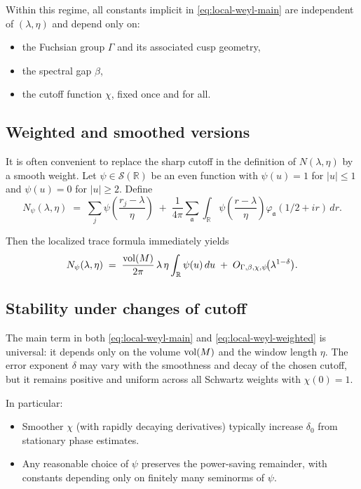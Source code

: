 Within this regime, all constants implicit in \eqref{eq:local-weyl-main} are independent of $(\lambda,\eta)$ and depend only on:
\begin{itemize}
  \item the Fuchsian group $\Gamma$ and its associated cusp geometry,
  \item the spectral gap $\beta$,
  \item the cutoff function $\chi$, fixed once and for all.
\end{itemize}

\subsection{Weighted and smoothed versions}

It is often convenient to replace the sharp cutoff in the definition of $N(\lambda,\eta)$ by a smooth weight. Let $\psi\in\mathcal{S}(\mathbb{R})$ be an even function with $\psi(u)=1$ for $|u|\le 1$ and $\psi(u)=0$ for $|u|\ge 2$. Define
\[
N_\psi(\lambda,\eta)\;=\;\sum_j \psi\!\left(\frac{r_j-\lambda}{\eta}\right)
\;+\;\frac{1}{4\pi}\sum_{\mathfrak{a}} \int_{\mathbb{R}}
\psi\!\left(\frac{r-\lambda}{\eta}\right)\varphi_\mathfrak{a}(1/2+ir)\,dr.
\]

Then the localized trace formula immediately yields
\begin{equation}\label{eq:local-weyl-weighted}
N_\psi(\lambda,\eta)
\;=\;\frac{\operatorname{vol}(M)}{2\pi}\,\lambda\,\eta \int_{\mathbb{R}}\psi(u)\,du
\;+\; O_{\Gamma,\beta,\chi,\psi}\!\big(\lambda^{1-\delta}\big).
\end{equation}

\subsection{Stability under changes of cutoff}

The main term in both \eqref{eq:local-weyl-main} and \eqref{eq:local-weyl-weighted} is universal: it depends only on the volume $\operatorname{vol}(M)$ and the window length $\eta$. The error exponent $\delta$ may vary with the smoothness and decay of the chosen cutoff, but it remains positive and uniform across all Schwartz weights with $\chi(0)=1$.

In particular:
\begin{itemize}
  \item Smoother $\chi$ (with rapidly decaying derivatives) typically increase $\delta_0$ from stationary phase estimates.
  \item Any reasonable choice of $\psi$ preserves the power-saving remainder, with constants depending only on finitely many seminorms of $\psi$.
\end{itemize}

